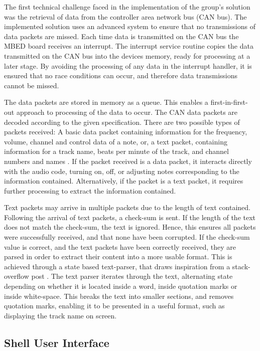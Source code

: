 The first technical challenge faced in the implementation of the group's solution
was the retrieval of data from the controller area network bus (CAN bus). The 
implemented solution uses an advanced system to ensure that no transmissions of 
data packets are missed. 
Each time data is transmitted on the CAN bus the MBED board receives an interrupt. 
The interrupt service routine copies the data transmitted on the CAN bus into 
the devices memory, ready for processing at a later stage. 
By avoiding the processing of any data in the interrupt handler, it is ensured 
that no race conditions can occur, and therefore data transmissions cannot be 
missed. 
\par\bigskip\noindent
The data packets are stored in memory as a queue. 
This enables a first-in-first-out approach to processing of the data to occur. 
The CAN data packets are decoded according to the given specification. 
There are two possible types of packets received: A basic data packet containing 
information for the frequency, volume, channel and control data of a note, or, 
a text packet, containing information for a track name, beats per minute of the 
track, and channel numbers and names \cite{data-packet}.
If the packet received is a data packet, it interacts directly with the audio 
code, turning on, off, or adjusting notes corresponding to the information 
contained. 
Alternatively, if the packet is a text packet, it requires further processing to 
extract the information contained. 
\par\bigskip\noindent
Text packets may arrive in multiple packets due to the length of text contained. 
Following the arrival of text packets, a check-sum is sent. 
If the length of the text does not match the check-sum, the text is ignored. 
Hence, this ensures all packets were successfully received, and that none have 
been corrupted. 
If the check-sum value is correct, and the text packets have been correctly 
received, they are parsed in order to extract their content into a more usable 
format. 
This is achieved through a state based text-parser, that draws inspiration from 
a stack-overflow post \cite{text-parser}. 
The text parser iterates through the text, alternating state depending on whether 
it is located inside a word, inside quotation marks or inside white-space. 
This breaks the text into smaller sections, and removes quotation marks, 
enabling it to be presented in a useful format, such as displaying the track 
name on screen. 


\subsection*{Shell User Interface}

